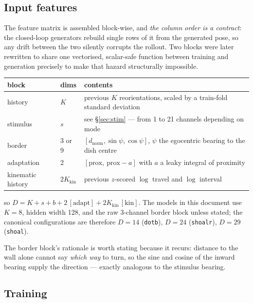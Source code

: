 \documentclass[11pt,a4paper]{article}
\newcommand{\code}[1]{\texttt{\small #1}}
\begin{document}
\subsection{Input features}

The feature matrix is assembled block-wise, and \emph{the column order is a contract}:
the closed-loop generators rebuild single rows of it from the generated pose, so any
drift between the two silently corrupts the rollout. Two blocks were later rewritten to
share one vectorised, scalar-safe function between training and generation precisely to
make that hazard structurally impossible.

\begin{center}\small
\begin{tabular}{llp{}}
\toprule
\textbf{block} & \textbf{dims} & \textbf{contents} \\
\midrule
history      & $K$ & previous $K$ reorientations, scaled by a train-fold standard deviation \\
stimulus     & $s$ & see \S\ref{sec:stim} --- from 1 to 21 channels depending on mode \\
border       & 3 or 9 & $[d_{\mathrm{norm}}, \sin\psi, \cos\psi]$, $\psi$ the egocentric bearing to the dish centre \\
adaptation   & 2 & $[\text{prox},\ \text{prox} - a]$ with $a$ a leaky integral of proximity \\
kinematic history & $2K_{\mathrm{kin}}$ & previous $z$-scored $\log$ travel and $\log$ interval \\
\bottomrule
\end{tabular}
\end{center}

so $D = K + s + b + 2\,[\text{adapt}] + 2K_{\mathrm{kin}}\,[\text{kin}]$. The models in
this document use $K=8$, hidden width 128, and the raw 3-channel border block unless
stated; the canonical configurations are therefore $D=14$ (\code{dotb}), $D=24$
(\code{shoalr}), $D=29$ (\code{shoal}).

The border block's rationale is worth stating because it recurs: distance to the wall
alone cannot say \emph{which way} to turn, so the sine and cosine of the inward bearing
supply the direction --- exactly analogous to the stimulus bearing.

\subsection{Training}
\end{document}
